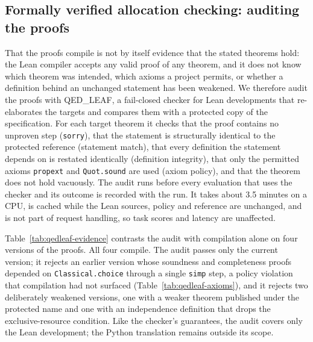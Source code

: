 \documentclass[a4paper,11pt]{article}
\begin{document}
\subsection{Formally verified allocation checking: auditing the proofs}
\label{sec:lean}

That the proofs compile is not by itself evidence that the stated theorems hold: the Lean
compiler accepts any valid proof of any theorem, and it does not know which theorem was intended,
which axioms a project permits, or whether a definition behind an unchanged statement has been
weakened. We therefore audit the proofs with QED\_LEAF, a fail-closed checker for Lean
developments that re-elaborates the targets and compares them with a protected copy of the
specification. For each target theorem it checks that the proof contains no unproven step
(\texttt{sorry}), that the statement is structurally identical to the protected reference
(statement match), that every definition the statement depends on is restated identically
(definition integrity), that only the permitted axioms \texttt{propext} and \texttt{Quot.sound}
are used (axiom policy), and that the theorem does not hold vacuously. The audit runs before
every evaluation that uses the checker and its outcome is recorded with the run. It takes about
3.5 minutes on a CPU, is cached while the Lean sources, policy and reference are unchanged, and
is not part of request handling, so task scores and latency are unaffected.

Table~\ref{tab:qedleaf-evidence} contrasts the audit with compilation alone on four versions of
the proofs. All four compile. The audit passes only the current version; it rejects an earlier
version whose soundness and completeness proofs depended on \texttt{Classical.choice} through a
single \texttt{simp} step, a policy violation that compilation had not surfaced
(Table~\ref{tab:qedleaf-axioms}), and it rejects two deliberately weakened versions, one with a
weaker theorem published under the protected name and one with an independence definition that
drops the exclusive-resource condition. Like the checker's guarantees, the audit covers only the
Lean development; the Python translation remains outside its scope.
\end{document}
